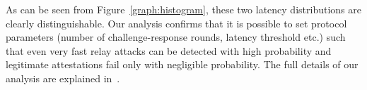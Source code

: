 As can be seen from Figure~\ref{graph:histogram}, these two latency distributions are clearly distinguishable. Our analysis confirms that it is possible to set protocol parameters (number of challenge-response rounds, latency threshold etc.) such that even very fast relay attacks can be detected with high probability and legitimate attestations fail only with negligible probability. The full details of our analysis are explained in~\cite{proximitee}.





